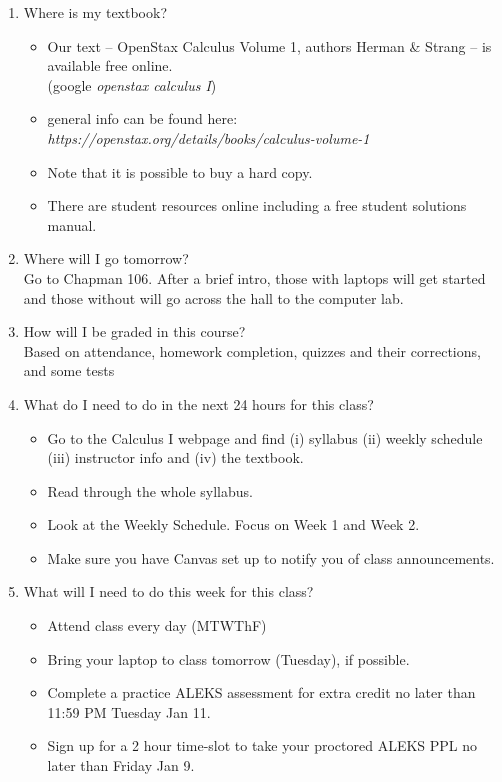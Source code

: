 \documentclass[11pt,fleqn]{article}
\begin{document}
\begin{enumerate}
\vfill
\item Where is my textbook?\\
\begin{itemize}
\item Our text -- OpenStax Calculus Volume 1, authors Herman \& Strang -- is available free online. \\
(google \emph{openstax calculus I})
\item general info can be found here: \textit{https://openstax.org/details/books/calculus-volume-1} 
\item Note that it is possible to buy a hard copy. 
\item There are student resources online including a free student solutions manual.
\end{itemize}
\vfill
\item Where will I go tomorrow?\\
Go to Chapman 106. After a brief intro, those with laptops will get started and those without will go across the hall to the computer lab.
\vfill
\item How will I be graded in this course? \\
Based on attendance, homework completion, quizzes and their corrections, and some tests
\vfill
\item What do I need to do in the next 24 hours for this class?\\
\begin{itemize}
\item Go to the Calculus I webpage and find (i) syllabus (ii) weekly schedule (iii) instructor info and (iv) the textbook.
\item Read through the whole syllabus.
\item Look at the Weekly Schedule. Focus on Week 1 and Week 2.
\item Make sure you have Canvas set up to notify you of class announcements.
\end{itemize}
\vfill
\item What will I need to do this week for this class?\\
\begin{itemize}
\item Attend class every day (MTWThF)
\item Bring your laptop to class tomorrow (Tuesday), if possible.
\item Complete a practice ALEKS assessment for extra credit no later than 11:59 PM Tuesday Jan 11.
\item Sign up for a 2 hour time-slot to take your proctored ALEKS PPL no later than Friday Jan 9.

\end{itemize}
\end{enumerate}
\end{document}
